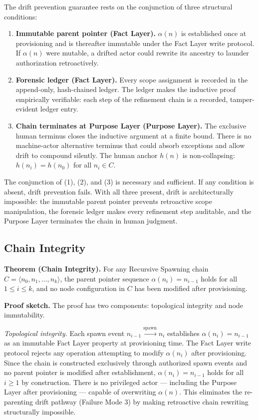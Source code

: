 \medskip
The drift prevention guarantee rests on the conjunction of three structural conditions:

\begin{enumerate}
  \item[(1)] \textbf{Immutable parent pointer (Fact Layer).} $\alpha(n)$ is established once at provisioning and is thereafter immutable under the Fact Layer write protocol. If $\alpha(n)$ were mutable, a drifted actor could rewrite its ancestry to launder authorization retroactively.
  \item[(2)] \textbf{Forensic ledger (Fact Layer).} Every scope assignment is recorded in the append-only, hash-chained ledger. The ledger makes the inductive proof empirically verifiable: each step of the refinement chain is a recorded, tamper-evident ledger entry.
  \item[(3)] \textbf{Chain terminates at Purpose Layer (Purpose Layer).} The exclusive human terminus closes the inductive argument at a finite bound. There is no machine-actor alternative terminus that could absorb exceptions and allow drift to compound silently. The human anchor $h(n)$ is non-collapsing: $h(n_i) = h(n_0)$ for all $n_i \in C$.
\end{enumerate}

The conjunction of (1), (2), and (3) is necessary and sufficient. If any condition is absent, drift prevention fails. With all three present, drift is architecturally impossible: the immutable parent pointer prevents retroactive scope manipulation, the forensic ledger makes every refinement step auditable, and the Purpose Layer terminates the chain in human judgment.

\subsection{Chain Integrity}
\label{sec:rs-chain-integrity}

\medskip
\noindent\textbf{Theorem (Chain Integrity).} For any Recursive Spawning chain $C = \langle n_0, n_1, \ldots, n_k \rangle$, the parent pointer sequence $\alpha(n_i) = n_{i-1}$ holds for all $1 \leq i \leq k$, and no node configuration in $C$ has been modified after provisioning.

\medskip
\noindent\textbf{Proof sketch.} The proof has two components: topological integrity and node immutability.

\medskip
\textit{Topological integrity.} Each spawn event $n_{i-1} \xrightarrow{\mathrm{spawn}} n_i$ establishes $\alpha(n_i) = n_{i-1}$ as an immutable Fact Layer property at provisioning time. The Fact Layer write protocol rejects any operation attempting to modify $\alpha(n_i)$ after provisioning. Since the chain is constructed exclusively through authorized spawn events and no parent pointer is modified after establishment, $\alpha(n_i) = n_{i-1}$ holds for all $i \geq 1$ by construction. There is no privileged actor — including the Purpose Layer after provisioning — capable of overwriting $\alpha(n)$. This eliminates the re-parenting drift pathway (Failure Mode 3) by making retroactive chain rewriting structurally impossible.

